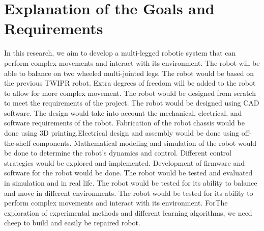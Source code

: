 \section{Explanation of the Goals and Requirements}
In this research, we aim to develop a multi-legged robotic system that can perform complex movements and interact with its environment.
The robot will be able to balance on two wheeled multi-jointed legs.
The robot would be based on the previous TWIPR robot.
Extra degrees of freedom will be added to the robot to allow for more complex movement.
The robot would be designed from scratch to meet the requirements of the project.
The robot would be designed using CAD software.
The design would take into account the mechanical, electrical, and software requirements of the robot.
Fabrication of the robot chassis would be done using 3D printing.Electrical design and assembly would be done using off-the-shelf components.
Mathematical modeling and simulation of the robot would be done to determine the robot's dynamics and control.
Different control strategies would be explored and implemented.
Development of firmware and software for the robot would be done.
The robot would be tested and evaluated in simulation and in real life.
The robot would be tested for its ability to balance and move in different environments.
The robot would be tested for its ability to perform complex movements and interact with its environment.
ForThe exploration of experimental methods and different learning algorithms, we need cheep to build and easily be repaired robot.